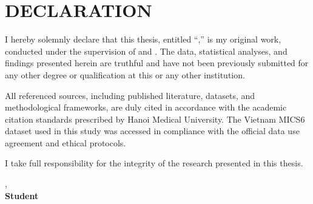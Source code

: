 \chapter*{DECLARATION}
{}

I hereby solemnly declare that this thesis, entitled ``\ThesisTitle,'' is my original work, conducted under the supervision of \SupervisorNameA{} and \SupervisorNameB. The data, statistical analyses, and findings presented herein are truthful and have not been previously submitted for any other degree or qualification at this or any other institution.

All referenced sources, including published literature, datasets, and methodological frameworks, are duly cited in accordance with the academic citation standards prescribed by Hanoi Medical University. The Vietnam MICS6 dataset used in this study was accessed in compliance with the official data use agreement and ethical protocols.

I take full responsibility for the integrity of the research presented in this thesis.

\begin{flushright}
\SubmissionCity, \SubmissionYear\\
\textbf{Student}\\[1.8cm]
\textbf{\StudentName}
\end{flushright}

\clearpage
